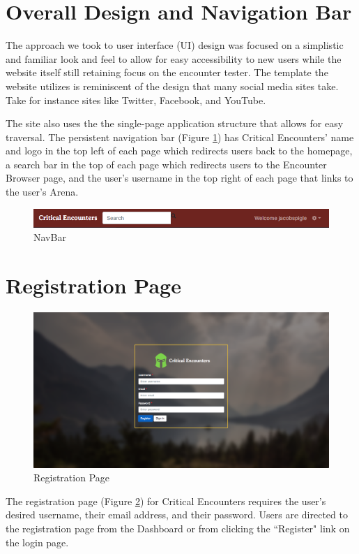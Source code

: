 \documentclass[12pt,a4paper]{report}
\begin{document}
	\section{Overall Design and Navigation Bar}
	The approach we took to user interface (UI) design was focused on a simplistic and familiar look and feel to allow for easy accessibility to new users while the website itself still retaining focus on the encounter tester. The template the website utilizes is reminiscent of the design that many social media sites take. Take for instance sites like Twitter, Facebook, and YouTube.\par
	The site also uses the the single-page application structure that allows for easy traversal. The persistent navigation bar (Figure \ref{fig: NavBar}) has Critical Encounters' name and logo in the top left of each page which redirects users back to the homepage, a search bar in the top of each page which redirects users to the Encounter Browser page, and the user's username in the top right of each page that links to the user's Arena.
	\bigskip
	\bigskip
	\begin{figure}[H]
		\centering
		\centerline{\includegraphics[scale=.30]{navbar}}
		\caption{NavBar}
		\label{fig: NavBar}
	\end{figure}
	\section{Registration Page}
	\begin{figure}[H]
		\centering
		\includegraphics[scale=.25]{register}
		\caption{Registration Page}
		\label{fig: Registration Page}
	\end{figure}
	The registration page (Figure \ref{fig: Registration Page})  for Critical Encounters requires the user's desired username, their email address, and their password. Users are directed to the registration page from the Dashboard or from clicking the ``Register" link on the login page.
	\newpage
\end{document}
